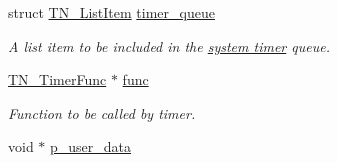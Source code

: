\begin{DoxyCompactItemize}
\item 
\hypertarget{structTN__Timer_a9418f1d84fa83d87197f3457ddb74e27}{struct \hyperlink{structTN__ListItem}{T\+N\+\_\+\+List\+Item} \hyperlink{structTN__Timer_a9418f1d84fa83d87197f3457ddb74e27}{timer\+\_\+queue}}\label{structTN__Timer_a9418f1d84fa83d87197f3457ddb74e27}

\begin{DoxyCompactList}\small\item\em A list item to be included in the {\itshape \hyperlink{time_ticks}{system timer}} queue. \end{DoxyCompactList}\item 
\hypertarget{structTN__Timer_a154ff9bb98135481b1874bdd8d6f2b9c}{\hyperlink{tn__timer_8h_a98be38210cd5a636dc4170e087ea0e67}{T\+N\+\_\+\+Timer\+Func} $\ast$ \hyperlink{structTN__Timer_a154ff9bb98135481b1874bdd8d6f2b9c}{func}}\label{structTN__Timer_a154ff9bb98135481b1874bdd8d6f2b9c}

\begin{DoxyCompactList}\small\item\em Function to be called by timer. \end{DoxyCompactList}\item 
\hypertarget{structTN__Timer_aaf753d5fb1001702f07379b2ed7ac177}{void $\ast$ \hyperlink{structTN__Timer_aaf753d5fb1001702f07379b2ed7ac177}{p\+\_\+user\+\_\+data}}\label{structTN__Timer_aaf753d5fb1001702f07379b2ed7ac177}


\end{DoxyCompactItemize}
